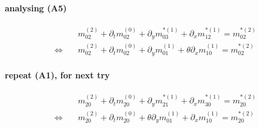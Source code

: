 \documentclass{article}
\begin{document}
  \paragraph{analysing (A5)}
  \begin{align*}
    &
    m_{02}^{(2)} + \partial_t m_{02}^{(0)} + \partial_y m_{03}^{*(1)} + \partial_x m_{12}^{*(1)} = m_{02}^{*(2)}
    \\ \Leftrightarrow\quad &
    m_{02}^{(2)} + \partial_t m_{02}^{(0)} + \partial_y m_{01}^{(1)} + \theta\partial_x m_{10}^{(1)} = m_{02}^{*(2)}
  \end{align*}

  \paragraph{repeat (A1), for next try}
  \begin{align*}
    &
    m_{20}^{(2)} + \partial_t m_{20}^{(0)} + \partial_y m_{21}^{*(1)} + \partial_x m_{30}^{*(1)} = m_{20}^{*(2)}
    \\ \Leftrightarrow\quad &
    m_{20}^{(2)} + \partial_t m_{20}^{(0)} + \theta\partial_y m_{01}^{(1)} + \partial_x m_{10}^{(1)} = m_{20}^{*(2)}
  \end{align*}

  \pagebreak
\end{document}
